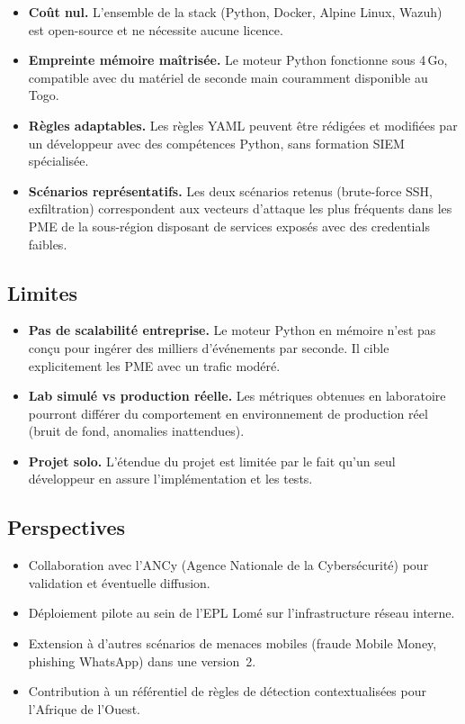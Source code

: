 \documentclass[11pt,a4paper]{article}
\begin{document}
\begin{itemize}
  \item \textbf{Coût nul.} L'ensemble de la stack (Python, Docker,
        Alpine Linux, Wazuh) est open-source et ne nécessite aucune licence.
  \item \textbf{Empreinte mémoire maîtrisée.} Le moteur Python fonctionne
        sous 4\,Go, compatible avec du matériel de seconde main
        couramment disponible au Togo.
  \item \textbf{Règles adaptables.} Les règles YAML peuvent être
        rédigées et modifiées par un développeur avec des compétences
        Python, sans formation SIEM spécialisée.
  \item \textbf{Scénarios représentatifs.} Les deux scénarios retenus
        (brute-force SSH, exfiltration) correspondent aux vecteurs
        d'attaque les plus fréquents dans les PME de la sous-région
        disposant de services exposés avec des credentials faibles.
\end{itemize}

\subsection{Limites}

\begin{itemize}
  \item \textbf{Pas de scalabilité entreprise.} Le moteur Python en mémoire
        n'est pas conçu pour ingérer des milliers d'événements par seconde.
        Il cible explicitement les PME avec un trafic modéré.
  \item \textbf{Lab simulé vs production réelle.} Les métriques obtenues
        en laboratoire pourront différer du comportement en environnement
        de production réel (bruit de fond, anomalies inattendues).
  \item \textbf{Projet solo.} L'étendue du projet est limitée par le fait
        qu'un seul développeur en assure l'implémentation et les tests.
\end{itemize}

\subsection{Perspectives}

\begin{itemize}
  \item Collaboration avec l'ANCy (Agence Nationale de la Cybersécurité)
        pour validation et éventuelle diffusion.
  \item Déploiement pilote au sein de l'EPL Lomé sur
        l'infrastructure réseau interne.
  \item Extension à d'autres scénarios de menaces mobiles
        (fraude Mobile Money, phishing WhatsApp) dans une version~2.
  \item Contribution à un référentiel de règles de détection
        contextualisées pour l'Afrique de l'Ouest.
\end{itemize}
\end{document}
